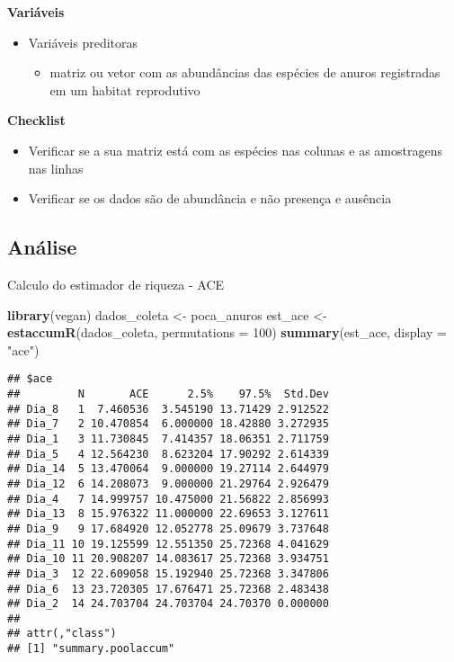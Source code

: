 \documentclass[
]{book}
\newenvironment{Shaded}{\begin{snugshade}}{\end{snugshade}}
\newcommand{\DataTypeTok}[1]{\textcolor[rgb]{0.13,0.29,0.53}{#1}}
\newcommand{\DecValTok}[1]{\textcolor[rgb]{0.00,0.00,0.81}{#1}}
\newcommand{\KeywordTok}[1]{\textcolor[rgb]{0.13,0.29,0.53}{\textbf{#1}}}
\newcommand{\NormalTok}[1]{#1}
\newcommand{\StringTok}[1]{\textcolor[rgb]{0.31,0.60,0.02}{#1}}
\providecommand{\tightlist}{%
  \setlength{\itemsep}{0pt}\setlength{\parskip}{0pt}}
\begin{document}
\textbf{Variáveis}

\begin{itemize}
\tightlist
\item
  Variáveis preditoras

  \begin{itemize}
  \tightlist
  \item
    matriz ou vetor com as abundâncias das espécies de anuros registradas em um habitat reprodutivo
  \end{itemize}
\end{itemize}

\textbf{Checklist}

\begin{itemize}
\tightlist
\item
  Verificar se a sua matriz está com as espécies nas colunas e as amostragens nas linhas
\item
  Verificar se os dados são de abundância e não presença e ausência
\end{itemize}

\hypertarget{anuxe1lise-1}{%
\subsection{Análise}\label{anuxe1lise-1}}

Calculo do estimador de riqueza - ACE

\begin{Shaded}
\begin{Highlighting}[]
\KeywordTok{library}\NormalTok{(vegan)}
\NormalTok{dados_coleta <-}\StringTok{ }\NormalTok{poca_anuros}
\NormalTok{est_ace <-}\StringTok{ }\KeywordTok{estaccumR}\NormalTok{(dados_coleta, }\DataTypeTok{permutations =} \DecValTok{100}\NormalTok{)}
\KeywordTok{summary}\NormalTok{(est_ace, }\DataTypeTok{display =} \StringTok{"ace"}\NormalTok{)}
\end{Highlighting}
\end{Shaded}

\begin{verbatim}
## $ace
##         N       ACE      2.5%    97.5%  Std.Dev
## Dia_8   1  7.460536  3.545190 13.71429 2.912522
## Dia_7   2 10.470854  6.000000 18.42880 3.272935
## Dia_1   3 11.730845  7.414357 18.06351 2.711759
## Dia_5   4 12.564230  8.623204 17.90292 2.614339
## Dia_14  5 13.470064  9.000000 19.27114 2.644979
## Dia_12  6 14.208073  9.000000 21.29764 2.926479
## Dia_4   7 14.999757 10.475000 21.56822 2.856993
## Dia_13  8 15.976322 11.000000 22.69653 3.127611
## Dia_9   9 17.684920 12.052778 25.09679 3.737648
## Dia_11 10 19.125599 12.551350 25.72368 4.041629
## Dia_10 11 20.908207 14.083617 25.72368 3.934751
## Dia_3  12 22.609058 15.192940 25.72368 3.347806
## Dia_6  13 23.720305 17.676471 25.72368 2.483438
## Dia_2  14 24.703704 24.703704 24.70370 0.000000
## 
## attr(,"class")
## [1] "summary.poolaccum"
\end{verbatim}
\end{document}
